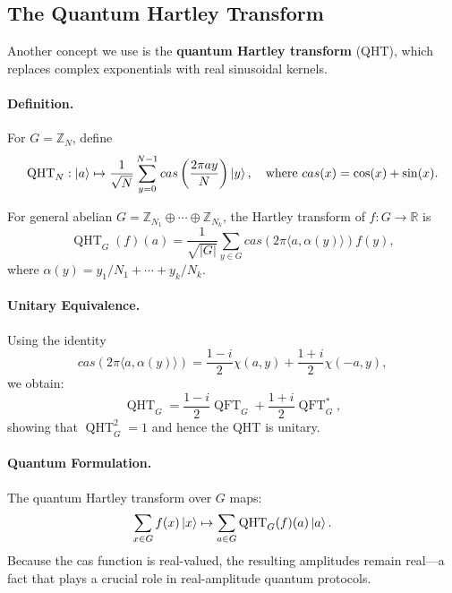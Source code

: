 \documentclass[12pt]{report}
\begin{document}
\subsection{The Quantum Hartley Transform}

Another concept we use is the \textbf{quantum Hartley transform} (QHT), which replaces complex exponentials with real sinusoidal kernels.

\paragraph{Definition.}
For $G = \mathbb{Z}_N$, define
\[
\operatorname{QHT}_N: \ket{a} \mapsto \frac{1}{\sqrt{N}} \sum_{y = 0}^{N - 1} cas\left(\frac{2\pi a y}{N}\right) \ket{y}, \quad \text{where } cas(x) = \cos(x) + \sin(x).
\]

For general abelian $G = \mathbb{Z}_{N_1} \oplus \cdots \oplus \mathbb{Z}_{N_k}$, the Hartley transform of $f : G \to \mathbb{R}$ is
\begin{equation}
    \operatorname{QHT}_G(f)({a}) = \frac{1}{\sqrt{|G|}} \sum_{{y} \in G} cas(2\pi \langle {a}, \alpha({y}) \rangle) f({y}),
\end{equation}
where $\alpha({y}) = y_1 / N_1 + \cdots + y_k / N_k$.

\paragraph{Unitary Equivalence.}
Using the identity
\[
cas(2\pi \langle {a}, \alpha({y}) \rangle) = \frac{1 - i}{2}\chi({a}, {y}) + \frac{1 + i}{2}\chi(-{a}, {y}),
\]
we obtain:
\begin{equation}
\operatorname{QHT}_G = \frac{1 - i}{2} \operatorname{QFT}_G + \frac{1 + i}{2} \operatorname{QFT}_G^*,
\end{equation}
showing that $\operatorname{QHT}_G^2 = {1}$ and hence the QHT is unitary.

\paragraph{Quantum Formulation.}
The quantum Hartley transform over $G$ maps:
\[
\sum_{{x} \in G} f({x}) \ket{{x}} \mapsto \sum_{{a} \in G} \operatorname{QHT}_G(f)({a}) \ket{{a}}.
\]
Because the cas function is real-valued, the resulting amplitudes remain real—a fact that plays a crucial role in real-amplitude quantum protocols.

\end{document}
